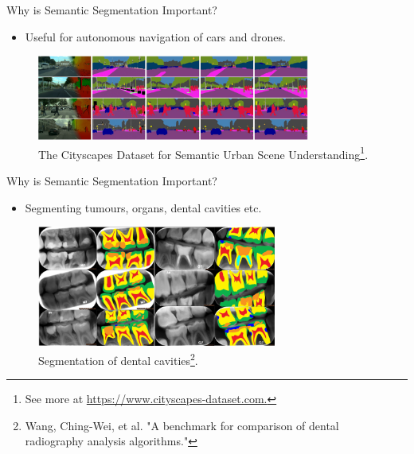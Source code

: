 \documentclass{beamer}
\begin{document}
\begin{frame}{Why is Semantic Segmentation Important?}
\\
\vspace{0.2cm}
\begin{itemize}
	\item
	Useful for autonomous navigation of cars and drones.
\end{itemize}
\begin{figure}
	\centering
	\includegraphics[width=0.8\textwidth]{figure/ss3.png}
	\captionsetup{justification=centering}
	\caption{The Cityscapes Dataset for Semantic Urban Scene Understanding\footnote{See more at \url{https://www.cityscapes-dataset.com.}}.}	
\end{figure}
\end{frame}

\begin{frame}{Why is Semantic Segmentation Important?}
\\
\vspace{0.2cm}
\begin{itemize}
	\item
Segmenting tumours, organs, dental cavities etc.
\end{itemize}
\begin{figure}
	\centering
	\includegraphics[width=0.7\textwidth]{figure/ss4.png}
	\captionsetup{justification=centering}
	\caption{Segmentation of dental cavities\footnote{Wang, Ching-Wei, et al. "A benchmark for comparison of dental \\ radiography analysis algorithms."}.}	
\end{figure}
\end{frame}
\end{document}
